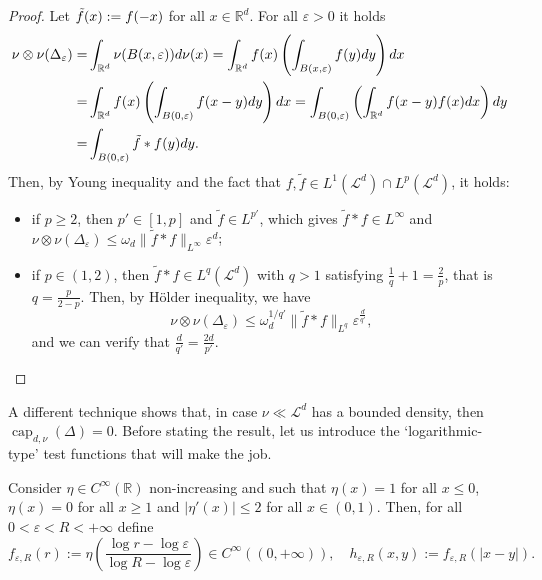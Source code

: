 \documentclass[10pt,leqno]{amsart}
\numberwithin{equation}{section}
\newcommand{\R}{\mathbb{R}}
\begin{document}
\begin{proof}
    Let $\Tilde{f}(x):= f(-x)$ for all $x\in \R^d$. For all $\varepsilon>0$ it holds
    \begin{align*}
        \nu\otimes \nu(\Delta_\varepsilon) = &\int_{\R^d} \nu(B(x,\varepsilon)) d\nu(x) 
         = \int_{\R^d} f(x) \left(\int_{B(x,\varepsilon)} f(y) dy\right) dx
         \\
         = & 
         \int_{\R^d} f(x) \left(\int_{B(0,\varepsilon)} f(x-y) dy \right) dx  = \int_{B(0,\varepsilon)} \left( \int_{\R^d} f(x-y) f(x) dx \right) dy 
         \\
         = & \int_{B(0,\varepsilon)} \Tilde{f}*f(y) dy.
    \end{align*}
    Then, by Young inequality and the fact that $f,\tilde{f}\in L^1(\mathcal{L}^d) \cap L^p(\mathcal{L}^d)$, it holds:
    \begin{itemize}
        \item[(i)] if $p\geq 2$, then $p'\in [1,p]$ and $\tilde{f} \in L^{p'}$, which gives $\tilde{f}*f \in L^{\infty}$ and $\nu\otimes \nu(\Delta_\varepsilon) \leq \omega_d\|\tilde{f}*f\|_{L^\infty} \varepsilon^d$;
        \item[(ii)] if $p\in (1,2)$, then $\tilde{f}*f\in L^{q}(\mathcal{L}^d)$ with $q>1$ satisfying $\frac{1}{q}+1 = \frac{2}{p}$, that is $q = \frac{p}{2-p}$. Then, by H\"older inequality, we have 
        \[\nu\otimes \nu (\Delta_\varepsilon) \leq \omega_d^{1/q'}\|\tilde{f}*f\|_{L^q} \varepsilon^{\frac{d}{q'}},\]
        and we can verify that $\frac{d}{q'} = \frac{2d}{p'}$. \qedhere
    \end{itemize}
\end{proof}

A different technique shows that, in case $\nu\ll\mathcal{L}^d$ has a bounded density, then $\operatorname{cap}_{d,\nu}(\Delta) = 0$. Before stating the result, let us introduce the `logarithmic-type' test functions that will make the job.


Consider $\eta \in C^{\infty}(\R)$ non-increasing and such that $\eta(x) = 1$ for all $x\leq 0$, $\eta(x) = 0$ for all $x\geq 1$ and $|\eta'(x)|\leq 2$ for all $x\in(0,1)$. Then, for all $0<\varepsilon<R<+\infty$ define
\begin{equation}\label{eq: log cut-off}
    f_{\varepsilon,R}(r) := \eta\left( \frac{\log r - \log \varepsilon}{\log R - \log \varepsilon} \right) \in C^{\infty}((0,+\infty)), \quad h_{\varepsilon,R}(x,y) := f_{\varepsilon,R}(|x-y|).
\end{equation}
\end{document}
